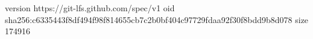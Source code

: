 version https://git-lfs.github.com/spec/v1
oid sha256:c6335443f8df494f98f814655cb7c2b0bf404c97729fdaa92f30f8bdd9b8d078
size 174916
